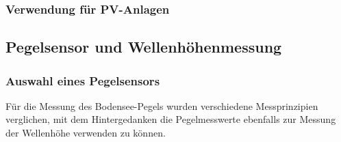 \subsubsection{Verwendung für PV-Anlagen}
\newline
{}\newline


\subsection{Pegelsensor und Wellenhöhenmessung}
\newline
{}\newline
{}\newline


\subsubsection{Auswahl eines Pegelsensors}
Für die Messung des Bodensee-Pegels wurden verschiedene Messprinzipien verglichen, mit dem Hintergedanken die Pegelmesswerte ebenfalls zur Messung der Wellenhöhe verwenden zu können.

